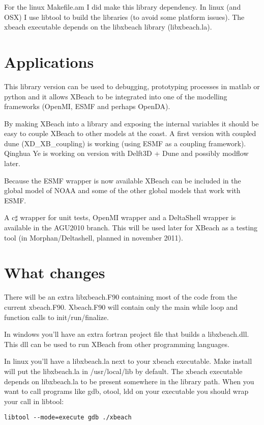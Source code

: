 \documentclass{article}
\begin{document}
For the linux Makefile.am I did make this library dependency. In linux (and OSX) I use libtool to build the libraries (to avoid some platform issues). The xbeach executable depends on the libxbeach library (libxbeach.la). 




\section{Applications}
This library version can be used to debugging, prototyping processes in matlab or python and it allows XBeach to be integrated into one of the modelling frameworks (OpenMI, ESMF and perhaps OpenDA). 

By making XBeach into a library and exposing the internal variables it should be easy to couple XBeach to other models at the coast. A first version with coupled dune (XD_XB_coupling) is working (using ESMF as a coupling framework). Qinghua Ye is working on version with Delft3D + Dune and possibly modflow later. 

Because the ESMF wrapper is now available XBeach can be included in the global model of NOAA and some of the other global models that work with ESMF. 

A c$\sharp$ wrapper for unit tests, OpenMI wrapper and a DeltaShell wrapper is available in the AGU2010 branch. This will be used later for XBeach as a testing tool (in Morphan/Deltashell, planned in november 2011). 

\section{What changes}
There will be an extra libxbeach.F90 containing most of the code from the current xbeach.F90. Xbeach.F90 will contain only the main while loop and function calls to init/run/finalize. 

In windows you'll have an extra fortran project file that builds a libxbeach.dll. This dll can be used to run XBeach from other programming languages. 

In linux you'll have a libxbeach.la next to your xbeach executable. Make install will put the libxbeach.la in /usr/local/lib by default. The xbeach executable depends on libxbeach.la to be present somewhere in the library path.
When you want to call programs like gdb, otool, ldd on your executable you should wrap your call in  libtool:
\begin{lstlisting}
libtool --mode=execute gdb ./xbeach
\end{lstlisting}
\end{document}
